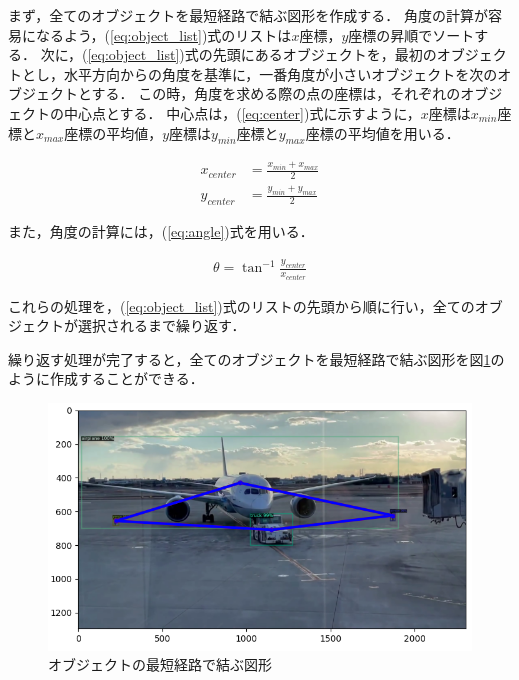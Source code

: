 \documentclass[a4j,12pt,dvipdfmx]{jreport}
\begin{document}
まず，全てのオブジェクトを最短経路で結ぶ図形を作成する．
角度の計算が容易になるよう，(\ref{eq:object_list})式のリストは$x$座標，$y$座標の昇順でソートする．
次に，(\ref{eq:object_list})式の先頭にあるオブジェクトを，最初のオブジェクトとし，水平方向からの角度を基準に，一番角度が小さいオブジェクトを次のオブジェクトとする．
この時，角度を求める際の点の座標は，それぞれのオブジェクトの中心点とする．
中心点は，(\ref{eq:center})式に示すように，$x$座標は$x_{min}$座標と$x_{max}$座標の平均値，$y$座標は$y_{min}$座標と$y_{max}$座標の平均値を用いる．

\begin{equation}
  \label{eq:center}
  \begin{split}
  x_{center} &= \frac{x_{min}+x_{max}}{2} \\
  y_{center} &= \frac{y_{min}+y_{max}}{2}
  \end{split}
\end{equation}

また，角度の計算には，(\ref{eq:angle})式を用いる．

\begin{eqnarray}
  \label{eq:angle}
  \theta = \tan^{-1} \frac{y_{center}}{x_{center}}
\end{eqnarray}

これらの処理を，(\ref{eq:object_list})式のリストの先頭から順に行い，全てのオブジェクトが選択されるまで繰り返す．

繰り返す処理が完了すると，全てのオブジェクトを最短経路で結ぶ図形を図\ref{fig:figure_2}のように作成することができる．

\begin{figure}[b]
  \begin{center}
    \includegraphics[width=15cm]{./image/figure_2.png}
    \caption{オブジェクトの最短経路で結ぶ図形}
    \label{fig:figure_2}
  \end{center}
\end{figure}
\end{document}
